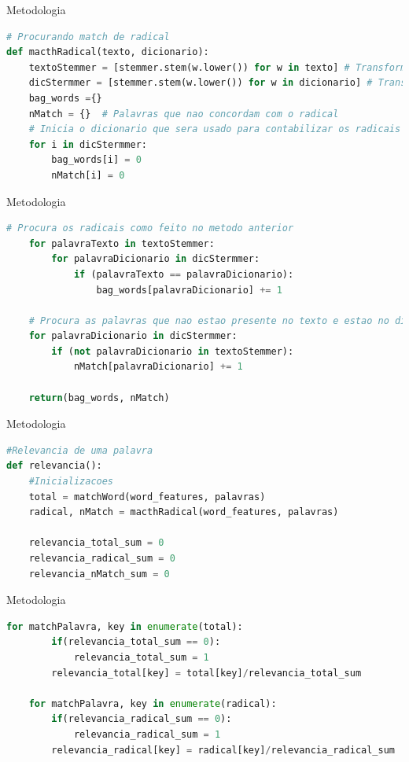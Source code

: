 \documentclass{beamer}
\begin{document}
	\begin{frame}[fragile]{Metodologia}
\begin{lstlisting}[language=Python, caption = Match de radical]
# Procurando match de radical
def macthRadical(texto, dicionario):
	textoStemmer = [stemmer.stem(w.lower()) for w in texto] # Transforma as palavras do dicionario em radicais
	dicStermmer = [stemmer.stem(w.lower()) for w in dicionario] # Transforma as palavras do texto em radicais
	bag_words ={}
	nMatch = {}  # Palavras que nao concordam com o radical
	# Inicia o dicionario que sera usado para contabilizar os radicais e as palavras que nao tiveram match
	for i in dicStermmer:
		bag_words[i] = 0
		nMatch[i] = 0
\end{lstlisting}
	\end{frame}

	\begin{frame}[fragile]{Metodologia}
\begin{lstlisting}[language=Python, caption = Match de radical(cont.)]
	# Procura os radicais como feito no metodo anterior
	for palavraTexto in textoStemmer:
		for palavraDicionario in dicStermmer:
			if (palavraTexto == palavraDicionario):
				bag_words[palavraDicionario] += 1
				
	# Procura as palavras que nao estao presente no texto e estao no dicionario
	for palavraDicionario in dicStermmer:
		if (not palavraDicionario in textoStemmer):
			nMatch[palavraDicionario] += 1
				
	return(bag_words, nMatch)
\end{lstlisting}
	\end{frame}

	\begin{frame}[fragile]{Metodologia}
\begin{lstlisting}[language=Python, caption = Relevância de cada palavra]
#Relevancia de uma palavra	
def relevancia():
	#Inicializacoes
	total = matchWord(word_features, palavras)
	radical, nMatch = macthRadical(word_features, palavras)
	
	relevancia_total_sum = 0
	relevancia_radical_sum = 0
	relevancia_nMatch_sum = 0	
	\end{lstlisting}
\end{frame}

	\begin{frame}[fragile]{Metodologia}
\begin{lstlisting}[language=Python, caption = Relevância de cada palavra(cont.)]
	for matchPalavra, key in enumerate(total):
		if(relevancia_total_sum == 0):
			relevancia_total_sum = 1
		relevancia_total[key] = total[key]/relevancia_total_sum
	
	for matchPalavra, key in enumerate(radical):
		if(relevancia_radical_sum == 0):
			relevancia_radical_sum = 1        
		relevancia_radical[key] = radical[key]/relevancia_radical_sum
\end{lstlisting}
	\end{frame}
\end{document}
